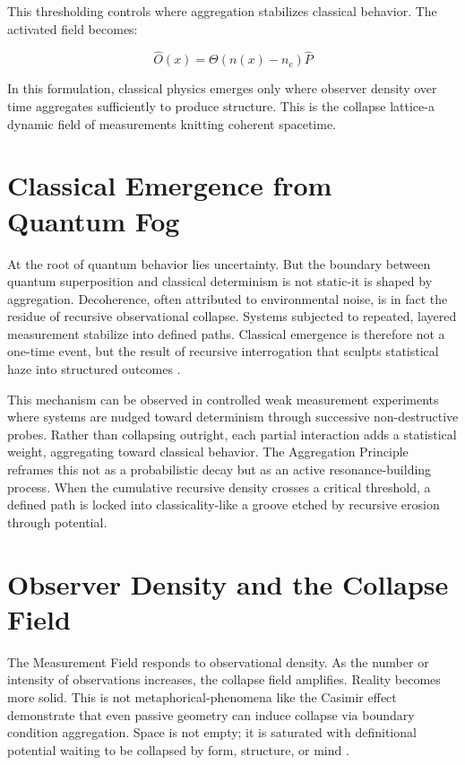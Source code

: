 This thresholding controls where aggregation stabilizes classical behavior. The activated field becomes:

\[
\hat{O}(x) = \Theta(n(x) - n_c) \hat{P}
\]

In this formulation, classical physics emerges only where observer density over time aggregates sufficiently to produce structure. This is the collapse lattice-a dynamic field of measurements knitting coherent spacetime.

\section{Classical Emergence from Quantum Fog}

At the root of quantum behavior lies uncertainty. But the boundary between quantum superposition and classical determinism is not static-it is shaped by aggregation. Decoherence, often attributed to environmental noise, is in fact the residue of recursive observational collapse. Systems subjected to repeated, layered measurement stabilize into defined paths. Classical emergence is therefore not a one-time event, but the result of recursive interrogation that sculpts statistical haze into structured outcomes \cite{aggregation_decoherence_core}.

This mechanism can be observed in controlled weak measurement experiments where systems are nudged toward determinism through successive non-destructive probes. Rather than collapsing outright, each partial interaction adds a statistical weight, aggregating toward classical behavior. The Aggregation Principle reframes this not as a probabilistic decay but as an active resonance-building process. When the cumulative recursive density crosses a critical threshold, a defined path is locked into classicality-like a groove etched by recursive erosion through potential.

\section{Observer Density and the Collapse Field}

The Measurement Field responds to observational density. As the number or intensity of observations increases, the collapse field amplifies. Reality becomes more solid. 
This is not metaphorical-phenomena like the Casimir effect demonstrate that even passive geometry can induce collapse via boundary condition aggregation. 
Space is not empty; it is saturated with definitional potential waiting to be collapsed by form, structure, or mind \cite{aggregation_decoherence_core}.

